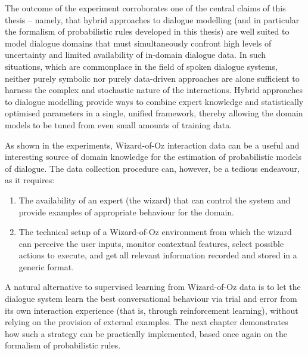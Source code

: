 The outcome of the experiment corroborates one of the central claims of this thesis -- namely, that hybrid approaches to dialogue modelling (and in particular the formalism of probabilistic rules developed in this thesis) are well suited to model dialogue domains that must simultaneously confront high levels of uncertainty and limited availability of in-domain dialogue data. In such situations, which are commonplace in the field of spoken dialogue systems, neither purely symbolic nor purely data-driven approaches are alone sufficient to harness the complex and stochastic nature of the interactions.  Hybrid approaches to dialogue modelling provide ways to combine expert knowledge and statistically optimised parameters in a single, unified framework, thereby allowing the domain models to be tuned from even small amounts of training data. 

As shown in the experiments, Wizard-of-Oz interaction data can be a useful and interesting source of domain knowledge for the estimation of probabilistic models of dialogue. The data collection procedure can, however, be a tedious endeavour, as it requires:
\begin{enumerate}
\item The availability of an expert (the wizard) that can control the system and provide examples of appropriate behaviour for the domain.
\item The technical setup of a Wizard-of-Oz environment from which the wizard can perceive the user inputs, monitor contextual features, select possible actions to execute, and get all relevant information recorded and stored in a generic format. 
\end{enumerate}

A natural alternative to supervised learning from Wizard-of-Oz data is to let the dialogue system learn the best conversational behaviour via trial and error from its own interaction experience (that is, through reinforcement learning), without relying on the provision of external examples.  The next chapter demonstrates how such a strategy can be practically implemented, based once again on the formalism of probabilistic rules.
